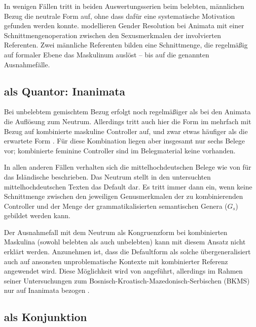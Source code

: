 In wenigen Fällen tritt in beiden Auswertungs\-serien beim belebten, männlichen
Bezug die neutrale Form auf, ohne dass dafür eine systematische Motivation
gefunden werden konnte. \citet{wechslerzlatic2003,wechsler2009} modellieren
Gender Resolution bei Animata mit einer Schnittmengenoperation zwischen den
Sexusmerkmalen der involvierten Referenten. Zwei männliche Referenten bilden
eine Schnittmenge, die regelmäßig auf formaler Ebene das Maskulinum auslöst --
bis auf die genannten Ausnahmefälle.

\subsection{ als Quantor: Inanimata}

Bei unbelebtem gemischtem Bezug erfolgt noch regelmäßiger als bei den Animata
die Auflösung zum Neutrum. Allerdings tritt auch hier die Form
 im  mehrfach mit Bezug auf kombinierte
maskuline Controller auf, und zwar etwas häufiger als die erwartete Form
. Für diese Kombination liegen aber insgesamt nur sechs Belege vor;
kombinierte feminine Controller sind im Belegmaterial keine vorhanden.

In allen anderen Fällen verhalten sich die mittelhochdeutschen Belege wie von
\citet{wechslerzlatic2003,wechsler2009} für das Isländische beschrieben. Das
Neutrum stellt in den untersuchten mittelhochdeutschen Texten das Default dar.
Es tritt immer dann ein, wenn keine Schnittmenge zwischen den jeweiligen
Genusmerkmalen der zu kombinierenden Controller und der Menge der
grammatikalisierten semantischen Genera ($G_s$) gebildet werden kann.

Der Ausnahmefall mit dem Neutrum als Kongruenzform bei kombinierten Maskulina
(sowohl belebten als auch unbelebten) kann mit diesem Ansatz nicht erklärt
werden. Anzunehmen ist, dass die Defaultform als solche übergeneralisiert auch
auf ansonsten unproblematische Kontexte mit kombinierter Referenz angewendet
wird. Diese Möglichkeit wird von \textcites[302]{corbett1991} angeführt,
allerdings im Rahmen seiner Untersuchungen zum
Bosnisch-\allowbreak{}Kroatisch-\allowbreak{}Mazedonisch-\allowbreak{}Serbischen
(BKMS) nur auf Inanimata bezogen
\autocites[vgl.~auch][190]{wechslerzlatic2003}[581]{wechsler2009}.

\subsection{ als Konjunktion}

